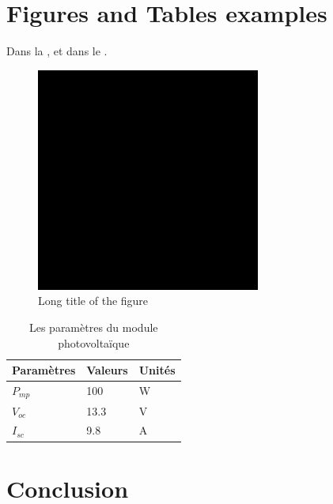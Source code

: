\section{Figures and Tables examples}
Dans la , et dans le .
\begin{figure}[H]
	\centering
	\includegraphics[width=0.55\linewidth,scale=1.0]{5-Chapters/Chapter1/drawing.eps}
	\caption[Short title of the figure]{Long title of the figure\label{figLabel}}
\end{figure}

\begin{table}[H]
	\centering
	\caption{Les paramètres du module photovoltaïque 
		\label{tabLabel}}
	\begin{tabular}{@{\extracolsep{\fill}}lll@{}}
		\toprule
		Paramètres & Valeurs & Unités\\
		\midrule			
		$P_{mp}$& 100& \si{\watt}\\
		\midrule
		$V_{oc}$& 13.3& \si{\volt}\\
		\midrule
		$I_{sc}$& 9.8& \si{\ampere}\\							
		\bottomrule
	\end{tabular}
\end{table}
\section{Conclusion}
\blindtext